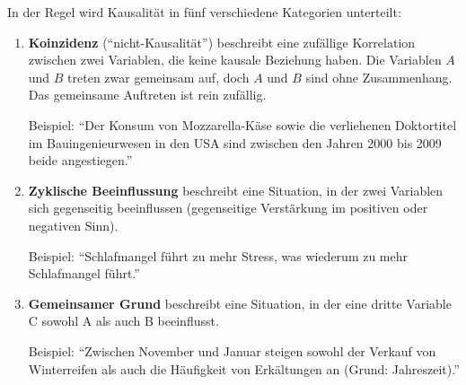 \begin{mydefinition}[Kausalität]
In der Regel wird Kausalität in fünf verschiedene Kategorien unterteilt:
\begin{enumerate}
	\item \textbf{Koinzidenz} (\enquote{nicht-Kausalität}) beschreibt eine zufällige Korrelation zwischen zwei Variablen, die keine kausale Beziehung haben. Die Variablen $A$ und $B$ treten zwar gemeinsam auf, doch $A$ und $B$ sind ohne Zusammenhang. Das gemeinsame Auftreten ist rein zufällig.
	      \begin{center}
	      \end{center}
	      Beispiel: \enquote{Der Konsum von Mozzarella-Käse sowie die verliehenen Doktortitel im Bauingenieurwesen in den USA sind zwischen den Jahren 2000 bis 2009 beide angestiegen.}
	\item \textbf{Zyklische Beeinflussung} beschreibt eine Situation, in der zwei Variablen sich gegenseitig beeinflussen (gegenseitige Verstärkung im positiven oder negativen Sinn).
	      \begin{center}
	      \end{center}
	      Beispiel: \enquote{Schlafmangel führt zu mehr Stress, was wiederum zu mehr Schlafmangel führt.}
	\item \textbf{Gemeinsamer Grund} beschreibt eine Situation, in der eine dritte Variable C sowohl A als auch B beeinflusst.
	      \begin{center}
	      \end{center}
	      Beispiel: \enquote{Zwischen November und Januar steigen sowohl der Verkauf von Winterreifen als auch die Häufigkeit von Erkältungen an (Grund: Jahreszeit).}


\end{enumerate}
\end{mydefinition}

